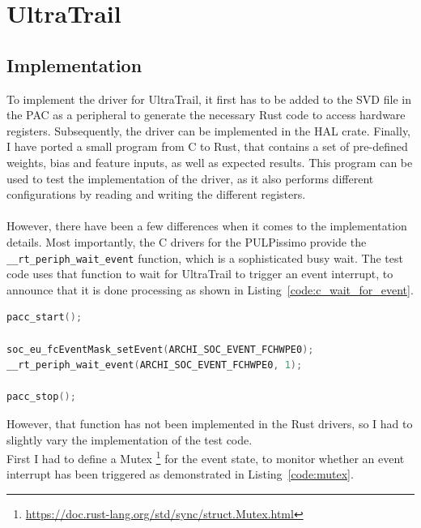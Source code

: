 \begin{minipage}{\textwidth}
\section{UltraTrail}

\subsection{Implementation}

To implement the driver for UltraTrail, it first has to be added to the SVD file in the PAC
as a peripheral to generate the necessary Rust code to access hardware registers.
Subsequently, the driver can be implemented in the HAL crate.
Finally, I have ported a small program from C to Rust, that contains a set of pre-defined
weights, bias and feature inputs, as well as expected results.
This program can be used to test the implementation of the driver, as it also
performs different configurations by reading and writing the different registers.
\\\\
However, there have been a few differences when it comes to the implementation details.
Most importantly, the C drivers for the PULPissimo provide the \lstinline{__rt_periph_wait_event} function,
which is a sophisticated busy wait.
The test code uses that function to wait for UltraTrail to trigger an event interrupt, to announce that
it is done processing as shown in Listing~\ref{code:c_wait_for_event}.
\end{minipage}

\begin{minipage}{\textwidth}
\begin{lstlisting}[style=colorEX,language=C,caption={Waiting for the event in C},label={code:c_wait_for_event}]
pacc_start();

soc_eu_fcEventMask_setEvent(ARCHI_SOC_EVENT_FCHWPE0);
__rt_periph_wait_event(ARCHI_SOC_EVENT_FCHWPE0, 1);

pacc_stop();
\end{lstlisting}
\end{minipage}

However, that function has not been implemented in the Rust drivers, so I had to slightly
vary the implementation of the test code.\\
First I had to define a Mutex \footnote{\url{https://doc.rust-lang.org/std/sync/struct.Mutex.html}}
for the event state, to monitor whether an event interrupt has been triggered as demonstrated
in Listing~\ref{code:mutex}.

